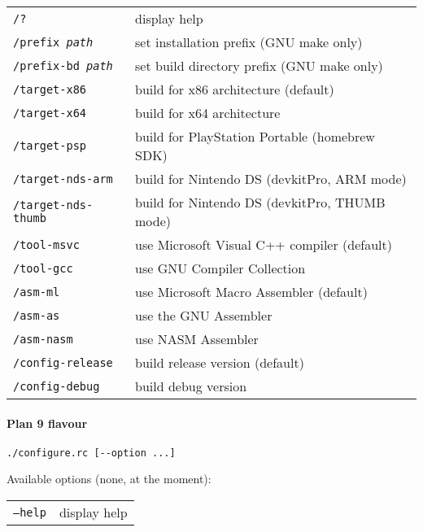 \begin{enumerate}
\begin{tabular*}{0.75\textwidth}{ll}
{\tt /?}                       & display help                                  \\
{\tt /prefix \textit{path}}    & set installation prefix (GNU make only)       \\
{\tt /prefix-bd \textit{path}} & set build directory prefix (GNU make only)    \\
{\tt /target-x86}              & build for x86 architecture (default)          \\
{\tt /target-x64}              & build for x64 architecture                    \\
{\tt /target-psp}              & build for PlayStation Portable (homebrew SDK) \\
{\tt /target-nds-arm}          & build for Nintendo DS (devkitPro, ARM mode)   \\
{\tt /target-nds-thumb}        & build for Nintendo DS (devkitPro, THUMB mode) \\
{\tt /tool-msvc}               & use Microsoft Visual C++ compiler (default)   \\
{\tt /tool-gcc}                & use GNU Compiler Collection                   \\
{\tt /asm-ml}                  & use Microsoft Macro Assembler (default)       \\
{\tt /asm-as}                  & use the GNU Assembler                         \\
{\tt /asm-nasm}                & use NASM Assembler                            \\
{\tt /config-release}          & build release version (default)               \\
{\tt /config-debug}            & build debug version                           \\
\end{tabular*}


\paragraph{Plan 9 flavour}

\begin{lstlisting}
./configure.rc [--option ...]
\end{lstlisting}

Available options (none, at the moment):

\begin{tabular*}{0.75\textwidth}{ll}
{\tt --help} & display help \\
\end{tabular*}



\end{enumerate}
